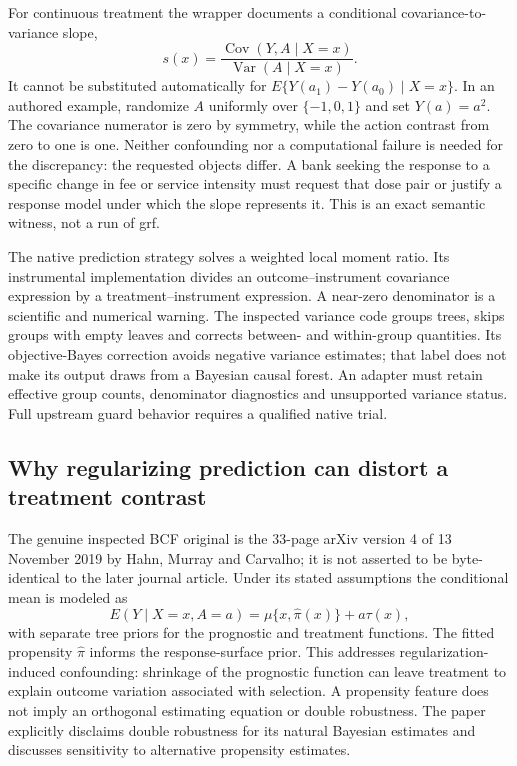 For continuous treatment the wrapper documents a conditional covariance-to-variance slope,
\begin{equation}
 s(x)=\frac{\operatorname{Cov}(Y,A\mid X=x)}{\operatorname{Var}(A\mid X=x)}.
 \label{exec21:cxx-slope}
\end{equation}
It cannot be substituted automatically for $E\{Y(a_1)-Y(a_0)\mid X=x\}$. In an authored example, randomize $A$ uniformly over $\{-1,0,1\}$ and set $Y(a)=a^2$. The covariance numerator is zero by symmetry, while the action contrast from zero to one is one. Neither confounding nor a computational failure is needed for the discrepancy: the requested objects differ. A bank seeking the response to a specific change in fee or service intensity must request that dose pair or justify a response model under which the slope represents it. This is an exact semantic witness, not a run of grf.\citep{exec21_cxx_grf,exec21_cxx_reference}

The native prediction strategy solves a weighted local moment ratio. Its instrumental implementation divides an outcome--instrument covariance expression by a treatment--instrument expression. A near-zero denominator is a scientific and numerical warning. The inspected variance code groups trees, skips groups with empty leaves and corrects between- and within-group quantities. Its objective-Bayes correction avoids negative variance estimates; that label does not make its output draws from a Bayesian causal forest. An adapter must retain effective group counts, denominator diagnostics and unsupported variance status. Full upstream guard behavior requires a qualified native trial.\citep{exec21_cxx_grf}

\subsection{Why regularizing prediction can distort a treatment contrast}
\label{exec21:cxx-prior}
The genuine inspected BCF original is the 33-page arXiv version 4 of 13 November 2019 by Hahn, Murray and Carvalho; it is not asserted to be byte-identical to the later journal article. Under its stated assumptions the conditional mean is modeled as
\begin{equation}
 E(Y\mid X=x,A=a)=\mu\{x,\widehat\pi(x)\}+a\tau(x),
 \label{exec21:cxx-bcf-model}
\end{equation}
with separate tree priors for the prognostic and treatment functions. The fitted propensity $\widehat\pi$ informs the response-surface prior. This addresses regularization-induced confounding: shrinkage of the prognostic function can leave treatment to explain outcome variation associated with selection. A propensity feature does not imply an orthogonal estimating equation or double robustness. The paper explicitly disclaims double robustness for its natural Bayesian estimates and discusses sensitivity to alternative propensity estimates.\citep{exec21_cxx_hahn}

